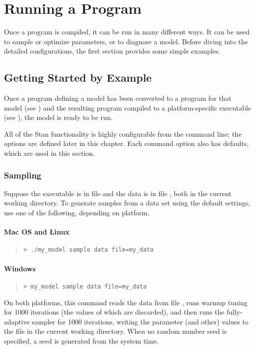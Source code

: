 
\chapter{Running a \Stan Program}\label{stan-cmd.chapter}

\noindent 
Once a \Stan program is compiled, it can be run in many different
ways.  It can be used to sample or optimize parameters, or to diagnose
a model.  Before diving into the detailed configurations, the first
section provides some simple examples.


\section{Getting Started by Example}\label{command-getting-started.section}

Once a \Stan program defining a model has been converted to a \Cpp
program for that model (see ) and the resulting \Cpp
program compiled to a platform-specific executable (see
), the model is ready to be run.

All of the Stan functionality is highly configurable from the command
line; the options are defined later in this chapter.  Each command
option also has defaults, which are used in this section.

\subsection{Sampling}

Suppose the executable is in file  and the data is in
file , both in the current working directory.  To
generate samples from a data set using the default settings, use one
of the following, depending on platform.

\subsubsection{Mac OS and Linux}
%
\begin{quote}
\begin{Verbatim}[fontshape=sl]
> ./my_model sample data file=my_data
\end{Verbatim}
\end{quote}

\subsubsection{Windows}
%
\begin{quote}
\begin{Verbatim}[fontshape=sl]
> my_model sample data file=my_data
\end{Verbatim}
\end{quote}
%
On both platforms, this command reads the data from file
, runs warmup tuning for 1000 iterations (the values
of which are discarded), and then runs the fully-adaptive \NUTS
sampler for 1000 iterations, writing the parameter (and other) values
to the file  in the current working directory.  When
no random number seed is specified, a seed is generated from the
system time.

